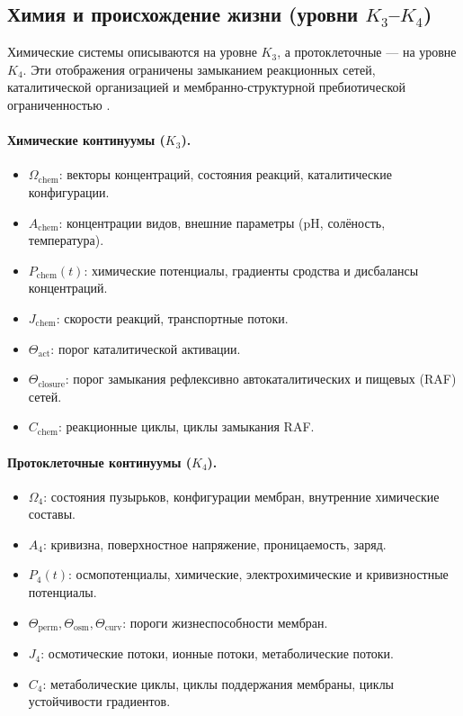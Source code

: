 \subsection{Химия и происхождение жизни (уровни
            \texorpdfstring{$K_3$}{K3}--\texorpdfstring{$K_4$}{K4})}

Химические системы описываются на уровне \(K_3\), а протоклеточные — на
уровне \(K_4\).
Эти отображения ограничены замыканием реакционных сетей, каталитической
организацией и мембранно-структурной пребиотической ограниченностью
\parencite{kauffman_autocatalytic,raf_networks}.

\paragraph{Химические континуумы (\texorpdfstring{$K_3$}{K3}).}
\begin{itemize}
  \item \(\Omega_{\mathrm{chem}}\): векторы концентраций, состояния реакций,
        каталитические конфигурации.
  \item \(A_{\mathrm{chem}}\): концентрации видов, внешние параметры
        (pH, солёность, температура).
  \item \(P_{\mathrm{chem}}(t)\): химические потенциалы, градиенты сродства и
        дисбалансы концентраций.
  \item \(J_{\mathrm{chem}}\): скорости реакций, транспортные потоки.
  \item \(\Theta_{\mathrm{act}}\): порог каталитической активации.
  \item \(\Theta_{\mathrm{closure}}\): порог замыкания рефлексивно
        автокаталитических и пищевых (RAF) сетей.
  \item \(C_{\mathrm{chem}}\): реакционные циклы, циклы замыкания RAF.
\end{itemize}

\paragraph{Протоклеточные континуумы (\texorpdfstring{$K_4$}{K4}).}
\begin{itemize}
  \item \(\Omega_{4}\): состояния пузырьков, конфигурации мембран,
        внутренние химические составы.
  \item \(A_4\): кривизна, поверхностное напряжение, проницаемость,
        заряд.
  \item \(P_4(t)\): осмопотенциалы, химические, электрохимические и
        кривизностные потенциалы.
  \item \(\Theta_{\mathrm{perm}}, \Theta_{\mathrm{osm}},
        \Theta_{\mathrm{curv}}\): пороги жизнеспособности мембран.
  \item \(J_4\): осмотические потоки, ионные потоки, метаболические потоки.
  \item \(C_4\): метаболические циклы, циклы поддержания мембраны,
        циклы устойчивости градиентов.
\end{itemize}

